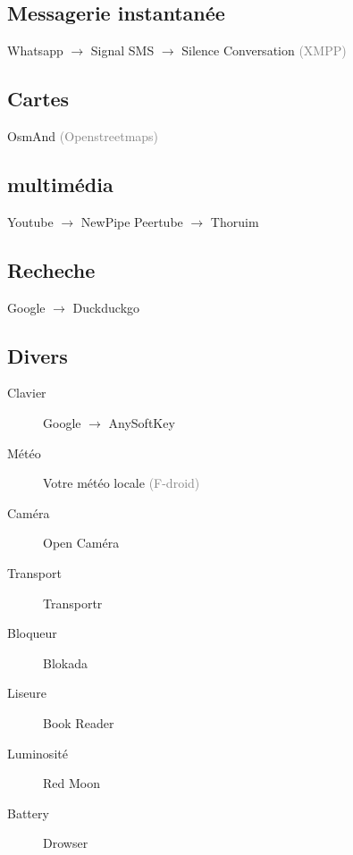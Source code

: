 \documentclass[aspectratio=169]{beamer}
\begin{document}
\subsection{Messagerie instantanée}
\begin{frame}
Whatsapp $\to$ Signal\newline
SMS $\to$ Silence\newline
Conversation \textcolor{gray}{\tiny{(XMPP)}}
\end{frame}

\subsection{Cartes}
\begin{frame}
OsmAnd \textcolor{gray}{\tiny{(Openstreetmaps)}}
\end{frame}

\subsection{multimédia}
\begin{frame}
Youtube $\to$ NewPipe\newline
Peertube $\to$ Thoruim
\end{frame}

\subsection{Recheche}
\begin{frame}
Google $\to$ Duckduckgo
\end{frame}

\subsection{Divers}
\begin{frame}
\begin{description}
	\item[Clavier] Google $\to$ AnySoftKey
	\item[Météo] Votre météo locale \textcolor{gray}{\tiny{(F-droid)}}
	\item[Caméra] Open Caméra
	\item[Transport] Transportr
	\item[Bloqueur] Blokada
	\item[Liseure] Book Reader
	\item[Luminosité] Red Moon
	\item[Battery] Drowser
\end{description}
\end{frame}
\end{document}
